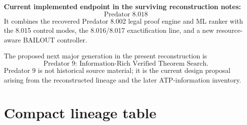 \documentclass[11pt]{article}
\begin{document}
\begin{keybox}
\textbf{Current implemented endpoint in the surviving reconstruction notes:}
\[
\boxed{\text{Predator 8.018}}
\]
It combines the recovered Predator 8.002 legal proof engine and ML ranker with the 8.015 control modes, the 8.016/8.017 exactification line, and a new resource-aware BAILOUT controller.
\end{keybox}

The proposed next major generation in the present reconstruction is
\[
\boxed{\text{Predator 9: Information-Rich Verified Theorem Search}.}
\]
Predator 9 is not historical source material; it is the current design proposal arising from the reconstructed lineage and the later ATP-information inventory.

\section{Compact lineage table}
\end{document}
